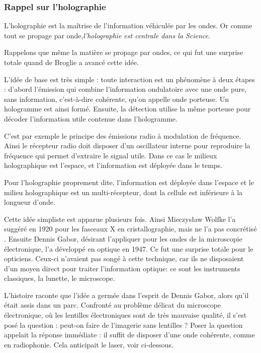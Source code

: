 \documentclass[a4paper,12pt]{article}
\begin{document}
\subsubsection{Rappel sur l'holographie}

L'holographie est la ma\^itrise de l'information véhiculée par les ondes. Or comme tout se propage par onde,\textit {l'holographie est centrale dans la Science}. 



Rappelons que même la matière se propage par ondes, ce qui fut une surprise totale quand de Broglie a avancé cette idée. 



L'idée de base est très simple : toute interaction est un phénomène à deux étapes : d'abord l'émission qui combine l'information ondulatoire avec une onde pure, sans information, c'est-à-dire cohérente, qu'on appelle onde porteuse. Un hologramme est ainsi formé. Ensuite, la détection utilise la même porteuse pour décoder l'information utile contenue dans l'hologramme.


C'est par exemple le principe des émissions radio à modulation de fréquence. Ainsi le récepteur radio doit disposer d'un oscillateur interne pour reproduire la fréquence qui permet d'extraire le signal utile. Dans ce cas le milieux holographique est l'espace, et l'information est déployée dans le temps.


Pour l'holographie proprement dite, l'information est déployée dans l'espace et le milieu holographique est un multi-récepteur, dont la cellule est inférieure à la longueur d'onde.


Cette idée simpliste est apparue plusieurs fois. Ainsi Mieczysław Wolfke l'a suggéré en 1920 pour les fasceaux X en cristallographie, mais ne l'a pas concrétisé \cite{Gabor}. Ensuite Dennis Gabor, désirant l'appliquer pour les ondes de la microscopie électronique, l'a développé en optique en 1947. Ce fut une surprise totale pour le opticiens. Ceux-ci n'avaient pas songé à cette technique, car ils ne disposaient d'un moyen direct pour traiter l'information optique: ce sont les instruments classiques, la lunette, le microscope.



L'histoire raconte que l'idée a germée dans l'esprit de Dennis Gabor, alors qu'il était assis dans un parc. Confronté au problème délicat du microscope électronique, où les lentilles électroniques sont de très mauvaise qualité, il s'est posé la question : peut-on faire de l'imagerie sans lentilles ? Poser la question appelait la réponse immédiate : il suffit de disposer d'une onde cohérente, comme en radiophonie. Cela anticipait le laser, voir ci-dessous.
\end{document}
